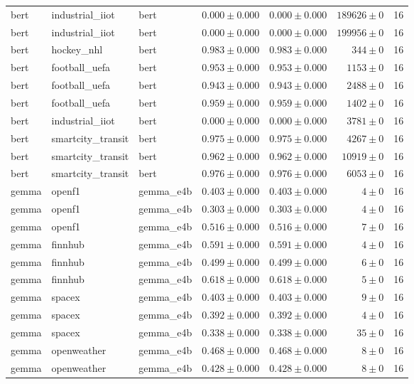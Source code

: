 \begin{table}[htbp]
\begin{tabular}{l l l r r r r}
bert & industrial\_iiot & bert & $0.000\pm0.000$ & $0.000\pm0.000$ & $189626\pm0$ & 16 \\
bert & industrial\_iiot & bert & $0.000\pm0.000$ & $0.000\pm0.000$ & $199956\pm0$ & 16 \\
bert & hockey\_nhl & bert & $0.983\pm0.000$ & $0.983\pm0.000$ & $344\pm0$ & 16 \\
bert & football\_uefa & bert & $0.953\pm0.000$ & $0.953\pm0.000$ & $1153\pm0$ & 16 \\
bert & football\_uefa & bert & $0.943\pm0.000$ & $0.943\pm0.000$ & $2488\pm0$ & 16 \\
bert & football\_uefa & bert & $0.959\pm0.000$ & $0.959\pm0.000$ & $1402\pm0$ & 16 \\
bert & industrial\_iiot & bert & $0.000\pm0.000$ & $0.000\pm0.000$ & $3781\pm0$ & 16 \\
bert & smartcity\_transit & bert & $0.975\pm0.000$ & $0.975\pm0.000$ & $4267\pm0$ & 16 \\
bert & smartcity\_transit & bert & $0.962\pm0.000$ & $0.962\pm0.000$ & $10919\pm0$ & 16 \\
bert & smartcity\_transit & bert & $0.976\pm0.000$ & $0.976\pm0.000$ & $6053\pm0$ & 16 \\
gemma & openf1 & gemma\_e4b & $0.403\pm0.000$ & $0.403\pm0.000$ & $4\pm0$ & 16 \\
gemma & openf1 & gemma\_e4b & $0.303\pm0.000$ & $0.303\pm0.000$ & $4\pm0$ & 16 \\
gemma & openf1 & gemma\_e4b & $0.516\pm0.000$ & $0.516\pm0.000$ & $7\pm0$ & 16 \\
gemma & finnhub & gemma\_e4b & $0.591\pm0.000$ & $0.591\pm0.000$ & $4\pm0$ & 16 \\
gemma & finnhub & gemma\_e4b & $0.499\pm0.000$ & $0.499\pm0.000$ & $6\pm0$ & 16 \\
gemma & finnhub & gemma\_e4b & $0.618\pm0.000$ & $0.618\pm0.000$ & $5\pm0$ & 16 \\
gemma & spacex & gemma\_e4b & $0.403\pm0.000$ & $0.403\pm0.000$ & $9\pm0$ & 16 \\
gemma & spacex & gemma\_e4b & $0.392\pm0.000$ & $0.392\pm0.000$ & $4\pm0$ & 16 \\
gemma & spacex & gemma\_e4b & $0.338\pm0.000$ & $0.338\pm0.000$ & $35\pm0$ & 16 \\
gemma & openweather & gemma\_e4b & $0.468\pm0.000$ & $0.468\pm0.000$ & $8\pm0$ & 16 \\
gemma & openweather & gemma\_e4b & $0.428\pm0.000$ & $0.428\pm0.000$ & $8\pm0$ & 16 \\

\end{tabular}
\end{table}
